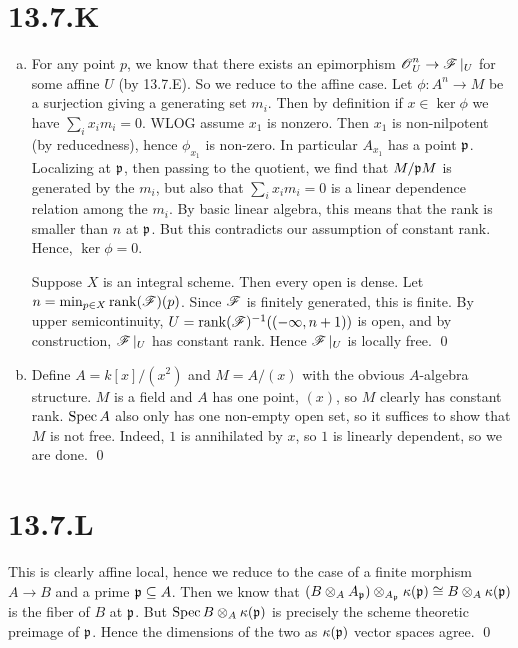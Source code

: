 \documentclass{article}
\begin{document}
\section*{13.7.K}
\begin{enumerate}[a.]
    \item For any point $p$, we know that there exists an epimorphism
          $\operatorname{\mathscr{O}}_U^n \to \operatorname{\mathscr{F}}|_U$ for some affine $U$ (by 13.7.E). So we
          reduce to the affine case. Let $\phi: A^n \to M$ be a surjection giving a
          generating set $m_i$. Then by definition if
          $x \in \ker \phi$ we have $\sum_i x_im_i=0$. WLOG assume
          $x_1$ is nonzero. Then $x_1$ is non-nilpotent
          (by reducedness), hence $\phi_{x_1}$ is non-zero. In particular
          $A_{x_1}$ has a point $\mathfrak{p}$. Localizing at
          $\mathfrak{p}$, then passing to the quotient, we find that
          $M/\mathfrak{p} M$ is generated by the $m_i$, but also
          that $\sum_i x_im_i=0$ is a linear dependence relation among the
          $m_i$. By basic linear algebra, this means that the rank is
          smaller than $n$ at $\mathfrak{p}$. But this
          contradicts our assumption of constant rank. Hence, $\ker \phi = 0$.

          Suppose $X$ is an integral scheme. Then every open is dense.
          Let $n=\min_{p \in X} \operatorname{rank}(\operatorname{\mathscr{F}})(p)$. Since $\operatorname{\mathscr{F}}$ is finitely generated,
          this is finite. By upper semicontinuity, $U=\operatorname{rank}(\operatorname{\mathscr{F}})^{-1}((-\infty, n+1))$ is open, and by
          construction, $\operatorname{\mathscr{F}}|_U$ has constant rank. Hence
          $\operatorname{\mathscr{F}}|_U$ is locally free. \qed

    \item Define $A=k[x]/(x^2)$ and $M=A/(x)$ with the obvious
          $A$-algebra structure. $M$ is a field and
          $A$ has one point, $(x)$, so
          $M$ clearly has constant rank. $\operatorname{Spec} A$ also
          only has one non-empty open set, so it suffices to show that
          $M$ is not free. Indeed, $1$ is
          annihilated by $x$, so $1$ is linearly
          dependent, so we are done. \qed
\end{enumerate}

\section*{13.7.L}
This is clearly affine local, hence we reduce to the case of a finite morphism
$A \to B$ and a prime $\mathfrak{p} \subseteq A$. Then we know that
$(B \otimes_A A_{\mathfrak{p}}) \otimes_{A_{\mathfrak{p}}} \kappa(\mathfrak{p}) \cong B
    \otimes_A \kappa(\mathfrak{p})$ is the fiber of $B$ at
$\mathfrak{p}$. But $\operatorname{Spec} B \otimes_A \kappa(\mathfrak{p})$ is precisely the scheme
theoretic preimage of $\mathfrak{p}$. Hence the dimensions of the two
as $\kappa(\mathfrak{p})$ vector spaces agree. \qed
\end{document}
